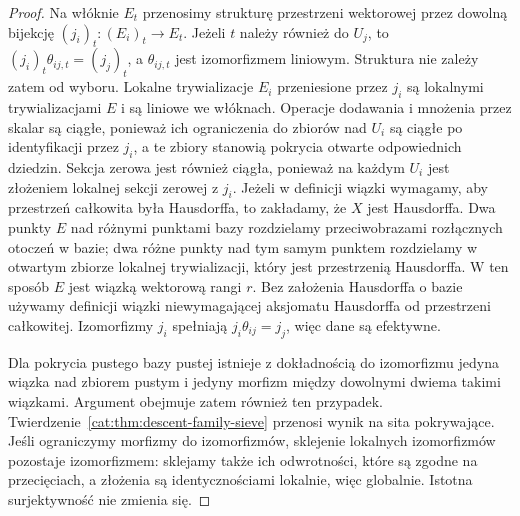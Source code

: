 \begin{proof}
Na włóknie $E_t$ przenosimy strukturę przestrzeni wektorowej przez dowolną bijekcję $(j_i)_t:(E_i)_t\to E_t$. Jeżeli $t$ należy również do $U_j$, to $(j_i)_t\theta_{ij,t}=(j_j)_t$, a $\theta_{ij,t}$ jest izomorfizmem liniowym. Struktura nie zależy zatem od wyboru. Lokalne trywializacje $E_i$ przeniesione przez $j_i$ są lokalnymi trywializacjami $E$ i są liniowe we włóknach. Operacje dodawania i mnożenia przez skalar są ciągłe, ponieważ ich ograniczenia do zbiorów nad $U_i$ są ciągłe po identyfikacji przez $j_i$, a te zbiory stanowią pokrycia otwarte odpowiednich dziedzin. Sekcja zerowa jest również ciągła, ponieważ na każdym $U_i$ jest złożeniem lokalnej sekcji zerowej z $j_i$. Jeżeli w definicji wiązki wymagamy, aby przestrzeń całkowita była Hausdorffa, to zakładamy, że $X$ jest Hausdorffa. Dwa punkty $E$ nad różnymi punktami bazy rozdzielamy przeciwobrazami rozłącznych otoczeń w bazie; dwa różne punkty nad tym samym punktem rozdzielamy w otwartym zbiorze lokalnej trywializacji, który jest przestrzenią Hausdorffa. W ten sposób $E$ jest wiązką wektorową rangi $r$. Bez założenia Hausdorffa o bazie używamy definicji wiązki niewymagającej aksjomatu Hausdorffa od przestrzeni całkowitej. Izomorfizmy $j_i$ spełniają $j_i\theta_{ij}=j_j$, więc dane są efektywne.

Dla pokrycia pustego bazy pustej istnieje z dokładnością do izomorfizmu jedyna wiązka nad zbiorem pustym i jedyny morfizm między dowolnymi dwiema takimi wiązkami. Argument obejmuje zatem również ten przypadek. Twierdzenie~\ref{cat:thm:descent-family-sieve} przenosi wynik na sita pokrywające. Jeśli ograniczymy morfizmy do izomorfizmów, sklejenie lokalnych izomorfizmów pozostaje izomorfizmem: sklejamy także ich odwrotności, które są zgodne na przecięciach, a złożenia są identycznościami lokalnie, więc globalnie. Istotna surjektywność nie zmienia się.
\end{proof}

